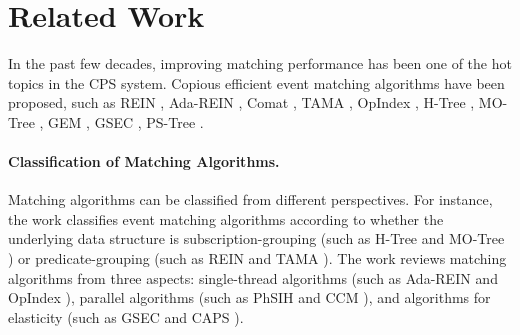\documentclass[runningheads]{llncs}
\begin{document}



\section{Related Work}
\label{rw}
In the past few decades, improving matching performance has been one of the hot topics in the CPS system. Copious efficient event matching algorithms have been proposed, such as REIN \cite{REIN}, Ada-REIN \cite{Ada-REIN}, Comat \cite{comat}, TAMA \cite{TAMA}, OpIndex \cite{OpIndex}, H-Tree \cite{H-tree}, MO-Tree \cite{MO-tree}, GEM \cite{GEM}, GSEC \cite{GSEC}, PS-Tree \cite{PS-Tree}. 

\paragraph{Classification of Matching Algorithms.}
Matching algorithms can be classified from different perspectives. 
For instance, the work \cite{2019PhSIH} classifies event matching algorithms according to whether the underlying data structure is subscription-grouping (such as H-Tree \cite{H-tree} and MO-Tree \cite{MO-tree}) or predicate-grouping (such as REIN \cite{REIN} and TAMA \cite{TAMA}). %
The work \cite{Lap} reviews matching algorithms from three aspects: single-thread algorithms (such as Ada-REIN \cite{Ada-REIN} and OpIndex \cite{OpIndex}), parallel algorithms (such as PhSIH \cite{2019PhSIH} and CCM \cite{CCM}), and algorithms for elasticity (such as GSEC \cite{GSEC} and CAPS \cite{Xingkong2017A}). 
\end{document}
